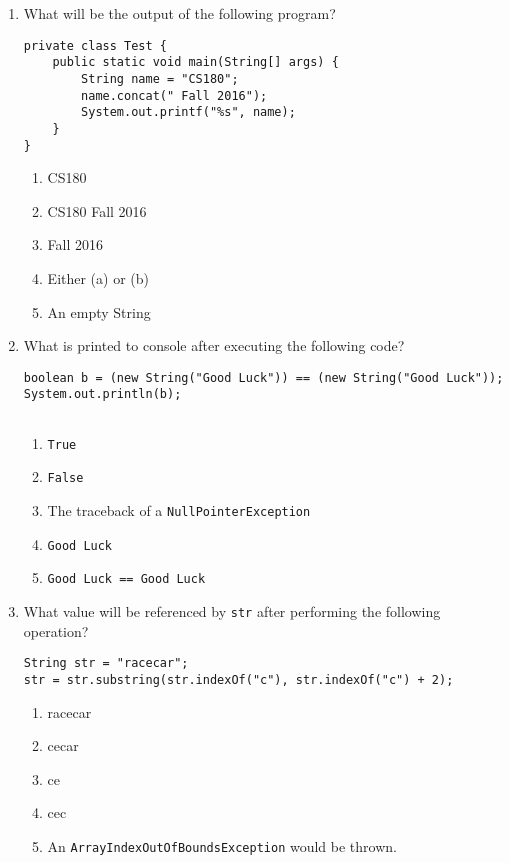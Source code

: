 \documentclass[CS180-S16-FinalExam.tex]{subfiles}
\begin{document}
\begin{enumerate}
\item What will be the output of the following program?
\begin{lstlisting}
private class Test {
	public static void main(String[] args) {
		String name = "CS180";
		name.concat(" Fall 2016");
        System.out.printf("%s", name);
    }
}
\end{lstlisting}

\begin{enumerate}
\item CS180 \ifdraft \Ans \fi
\item CS180 Fall 2016
\item Fall 2016
\item Either (a) or (b)
\item An empty String 
\end{enumerate}

\item What is printed to console after executing the following code?
\begin{lstlisting}
boolean b = (new String("Good Luck")) == (new String("Good Luck"));
System.out.println(b);


\end{lstlisting}

\begin{enumerate}
\item  \texttt{True} 
\item  \texttt{False} \ifdraft \Ans \fi
\item The traceback of a  \texttt{NullPointerException}
\item  \texttt{Good Luck}
\item  \texttt{Good Luck == Good Luck}
\end{enumerate}

\clearpage
\item What value will be referenced by \texttt{str} after performing the following operation?
\begin{lstlisting}
String str = "racecar";
str = str.substring(str.indexOf("c"), str.indexOf("c") + 2);
\end{lstlisting}

\begin{enumerate}
\item racecar 
\item cecar
\item ce \ifdraft \Ans \fi
\item cec
\item An \texttt{ArrayIndexOutOfBoundsException} would be thrown.
\end{enumerate}


\end{enumerate}
\end{document}
